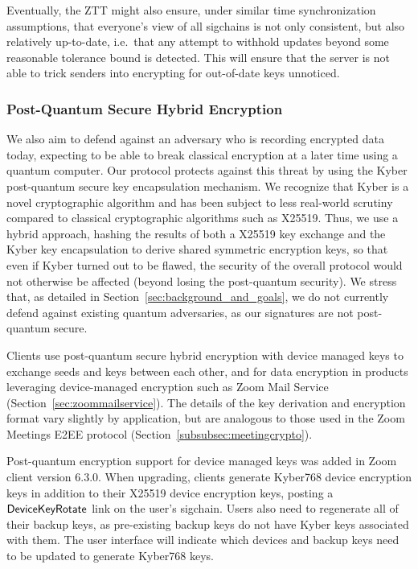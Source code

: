 Eventually, the ZTT might also ensure, under similar time synchronization assumptions, that
everyone's view of all sigchains is not only consistent, but also relatively up-to-date, i.e.\ that
any attempt to withhold updates beyond some reasonable tolerance bound is detected. This will ensure
that the server is not able to trick senders into encrypting for out-of-date keys unnoticed.

\subsubsection{Post-Quantum Secure Hybrid Encryption}
\label{subsubsec:sigchainpqsecurity}
We also aim to defend against an adversary who is recording encrypted data today, expecting to be
able to break classical encryption at a later time using a quantum computer. Our protocol protects
against this threat by using the Kyber post-quantum secure key encapsulation mechanism. We recognize
that Kyber is a novel cryptographic algorithm and has been subject to less real-world scrutiny
compared to classical cryptographic algorithms such as X25519. Thus, we use a hybrid approach,
hashing the results of both a X25519 key exchange and the Kyber key encapsulation to derive shared
symmetric encryption keys, so that even if Kyber turned out to be flawed, the security of the
overall protocol would not otherwise be affected (beyond losing the post-quantum security). We
stress that, as detailed in Section~\ref{sec:background_and_goals}, we do not currently defend
against existing quantum adversaries, as our signatures are not post-quantum secure. 

Clients use post-quantum secure hybrid encryption with device managed keys to exchange seeds and
keys between each other, and for data encryption in products leveraging device-managed encryption
such as Zoom Mail Service (Section~\ref{sec:zoommailservice}). The details of the key derivation and
encryption format vary slightly by application, but are analogous to those used in the Zoom Meetings
E2EE protocol (Section~\ref{subsubsec:meetingcrypto}).

Post-quantum encryption support for device managed keys was added in Zoom client version 6.3.0. When
upgrading, clients generate Kyber768 device encryption keys in addition to their X25519 device
encryption keys, posting a $\mathsf{DeviceKeyRotate}$ link on the user's sigchain. Users also need to
regenerate all of their backup keys, as pre-existing backup keys do not have Kyber keys associated
with them. The user interface will indicate which devices and backup keys need to be updated to
generate Kyber768 keys.

